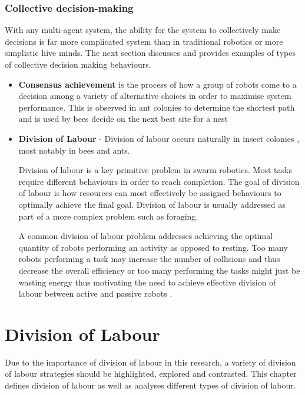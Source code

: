 \subsubsection{Collective decision-making}
With any multi-agent system, the ability for the system to collectively make decisions is far more complicated system than in traditional robotics or more simplistic hive minds. The next section discusses and provides examples of types of collective decision making behaviours. 

\begin{itemize}
	\item \textbf{Consensus achievement} is the process of how a group of robots come to a decision among a variety of alternative choices in order to maximise system performance. This is observed in ant colonies to determine the shortest path \cite{bonabeau2001self} and is used by bees decide on the next best site for a nest \cite{seeley2001nest}
	
	\item \textbf{Division of Labour} - Division of labour occurs naturally in insect colonies \cite{gautrais2002emergent}, most notably in bees and ants.

Division of labour is a key primitive problem in swarm robotics. Most tasks require different behaviours in order to reach completion. The goal of division of labour is how resources can most effectively be assigned behaviours to optimally achieve the final goal. Division of labour is usually addressed as part of a more complex problem such as foraging.
 
A common division of labour problem addresses achieving the optimal quantity of robots performing an activity as opposed to resting. Too many robots performing a task may increase the number of collisions and thus decrease the overall efficiency or too many performing the tasks might just be wasting energy thus motivating the need to achieve effective division of labour between active and passive robots \cite{jones2003adaptive, krieger2000call}.

\end{itemize}

\section{Division of Labour}

\label{chap:divisionoflabour}
Due to the importance of division of labour in this research, a variety of division of labour strategies should be highlighted, explored and contrasted. This chapter defines division of labour as well as analyses different types of division of labour.

